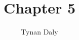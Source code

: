 \documentclass[12pt,oneside]{amsbook}
\title{Chapter 5}
\author{Tynan Daly}
\begin{document}
\begin{align*}

\end{align*}
\end{document}
